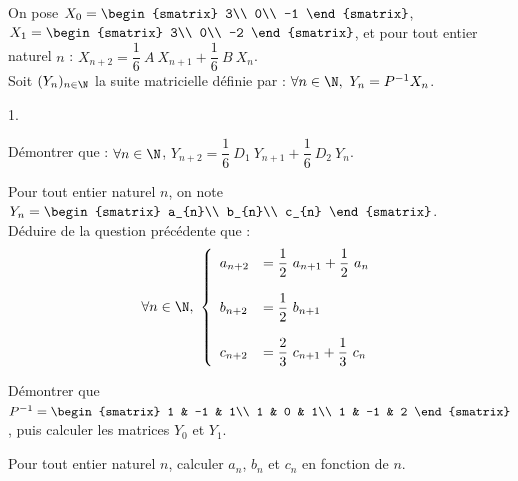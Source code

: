 \documentclass[11pt]{article}%
\begin{document}
\noindent
On pose $X_{0} =
\begin{smatrix}
  3\\
  0\\
  -1
\end{smatrix}
$, $X_{1} = 
\begin{smatrix}
  3\\
  0\\
  -2
\end{smatrix}
$, et pour tout entier naturel $n$ : $X_{n + 2} = \dfrac{1}{6} \ A \
X_{n + 1} + \dfrac{1}{6} \ B \ X_{n}$. \\
Soit $(Y_{n})_{n \in \N}$ la suite matricielle définie par : $\forall
n \in \N, \ Y_{n} = P^{-1} X_{n}$.
\begin{noliste}{1.}
  \setlength{\itemsep}{4mm}
\item Démontrer que : $\forall n \in \N $, $Y_{n + 2} = \dfrac{1}{6} \
  D_{1} \ Y_{n + 1} + \dfrac{1}{6} \ D_{2} \ Y_{n}$.

  

\item Pour tout entier naturel $n$, on note $Y_{n} =
  \begin{smatrix}
    a_{n}\\
    b_{n}\\
    c_{n}
  \end{smatrix}
  $.\\
  Déduire de la question précédente que :
  \[
  \forall n \in \N, \ \left\{
    \begin{array}{ll}
      a_{n + 2} & = \dfrac{1}{2} \ a_{n + 1} + \dfrac{1}{2} \ a_{n}\\
      & \\
      b_{n + 2} & = \dfrac{1}{2} \ b_{n + 1}\\
      & \\
      c_{n + 2} & = \dfrac{2}{3} \ c_{n + 1} + \dfrac{1}{3} \ c_{n}
    \end{array}
  \right.
  \]

  

\item Démontrer que $P^{-1} =
  \begin{smatrix}
    1 & -1 & 1\\
    1 & 0 & 1\\
    1 & -1 & 2
  \end{smatrix}
  $, puis calculer les matrices $Y_{0}$ et $Y_{1}$.

  

\item Pour tout entier naturel $n$, calculer $a_{n}$, $b_{n}$ et
  $c_{n}$ en fonction de $n$.


\end{noliste}
\end{document}
